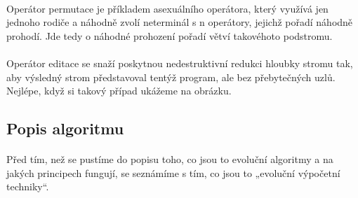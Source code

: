 \documentclass[bc,male,java,dept460]{diploma}		%
\begin{document}
\paragraph*{}
Operátor permutace je příkladem asexuálního operátora, který využívá jen jednoho rodiče a náhodně zvolí neterminál s n operátory, jejichž pořadí náhodně prohodí. Jde tedy o náhodné prohození pořadí větví takovéhoto podstromu.

\paragraph*{}
Operátor editace se snaží poskytnou nedestruktivní redukci hloubky stromu tak, aby výsledný strom představoval tentýž program, ale bez přebytečných uzlů. Nejlépe, když si takový případ ukážeme na obrázku.


\subsection{Popis algoritmu}
\paragraph*{}
Před tím, než se pustíme do popisu toho, co jsou to evoluční algoritmy a na jakých principech fungují, se seznámíme s tím, co jsou to „evoluční výpočetní techniky“.
\end{document}
